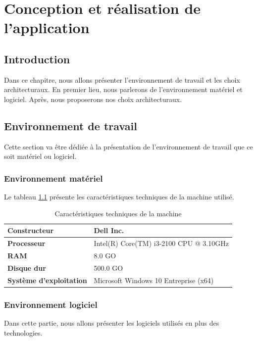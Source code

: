 \chapter{Conception et réalisation de l'application}
\section{Introduction}
Dans ce chapitre, nous allons présenter l'environnement de travail et les choix architecturaux. En premier lieu, nous parlerons de l'environnement matériel et logiciel. Après, nous proposerons nos choix architecturaux.
\section{Environnement de travail}
Cette section va être dédiée à la présentation de l'environnement de travail que ce soit matériel ou logiciel.
\subsection{Environnement matériel}
Le tableau \ref{code20} présente les caractéristiques techniques de la machine utilisé.
\begin{table}[H]
\centering
\caption{Caractéristiques techniques de la machine}
\label{code20}
\begin{tabular}{|l|l|}
\hline
\textbf{Constructeur} & Dell Inc. \\
\hline
\textbf{Processeur} & Intel(R) Core(TM) i3-2100 CPU @ 3.10GHz \\ \hline
\textbf{RAM} & 8.0 GO \\ \hline
\textbf{Disque dur} & 500.0 GO \\ \hline
\textbf{Système d'exploitation} & Microsoft Windows 10 Entreprise (x64) \\ \hline
\end{tabular}
\end{table}
\subsection{Environnement logiciel}
Dans cette partie, nous allons présenter les logiciels utilisés en plus des technologies.
